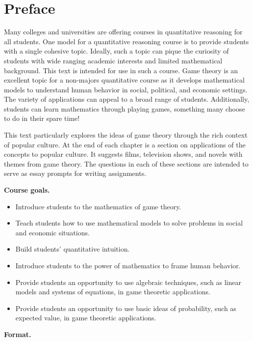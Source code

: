 \section{Preface}

Many colleges and universities are offering courses in quantitative reasoning for all students. One model for a quantitative reasoning course is to provide students with a single cohesive topic. Ideally, such a topic can pique the curiosity of students with wide ranging academic interests and limited mathematical background. This text is intended for use in such a course. Game theory is an excellent topic for a non-majors quantitative course as it develops mathematical models to understand human behavior in social, political, and economic settings. The variety of applications can appeal to a broad range of students. Additionally, students can learn mathematics through playing games, something many choose to do in their spare time! 

This text particularly explores the ideas of game theory through the rich context of popular culture. At the end of each chapter is a section on applications of the concepts to popular culture. It suggests films, television shows, and novels with themes from game theory. The questions in each of these sections are intended to serve as essay prompts for writing assignments.

\vspace{.1in}
\noindent
{\bf Course goals.}

\begin{itemize}
\item Introduce students to the mathematics of game theory.
\item Teach students how to use mathematical models to solve problems in social and economic situations.
\item Build students' quantitative intuition.
\item Introduce students to the power of mathematics to frame human behavior.
\item Provide students an opportunity to use algebraic techniques, such as linear models and systems of equations, in game theoretic applications.
\item Provide students an opportunity to use basic ideas of probability, such as expected value, in game theoretic applications.
\end{itemize}

\vspace{.1in}
\noindent
{\bf Format.}

